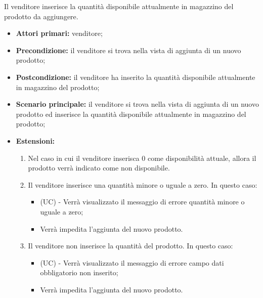 Il venditore inserisce la quantità disponibile attualmente in magazzino del prodotto da aggiungere.
\begin{itemize}
    \item \textbf{Attori primari:} venditore;
    \item \textbf{Precondizione:} il venditore si trova nella vista di aggiunta di un nuovo prodotto;
    \item \textbf{Postcondizione:} il venditore ha inserito la quantità disponibile attualmente in magazzino del prodotto;
    \item \textbf{Scenario principale:} il venditore si trova nella vista di aggiunta di un nuovo prodotto ed inserisce la quantità disponibile attualmente in magazzino del prodotto;
    \item \textbf{Estensioni:}
    \begin{enumerate}
    	\item Nel caso in cui il venditore inserisca 0 come disponibilità attuale, allora il prodotto verrà indicato come non disponibile.
    	\item Il venditore inserisce una quantità minore o uguale a zero. In questo caso:
    	\begin{itemize}
    		\item (UC) - Verrà visualizzato il messaggio di errore quantità minore o uguale a zero;
    		\item Verrà impedita l'aggiunta del nuovo prodotto.
    	\end{itemize}
    	\item Il venditore non inserisce la quantità del prodotto. In questo caso:
    	\begin{itemize}
    		\item (UC) - Verrà visualizzato il messaggio di errore campo dati obbligatorio non inserito;
    		\item Verrà impedita l'aggiunta del nuovo prodotto.
    	\end{itemize}
    \end{enumerate}
\end{itemize}

